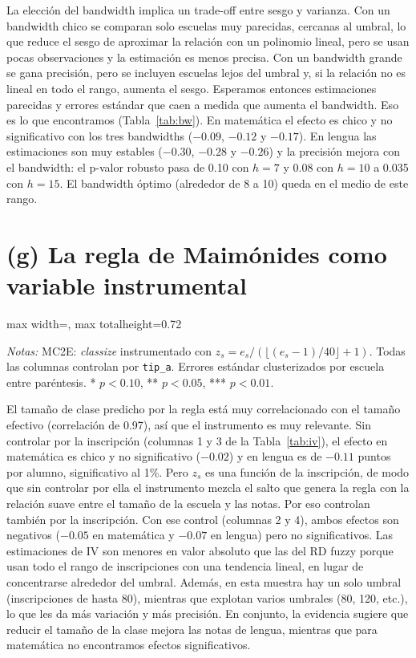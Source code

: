 \documentclass[11pt,a4paper]{article}
\newcommand{\tabla}[1]{\begin{adjustbox}{max width=\linewidth, max totalheight=0.72\textheight}\end{adjustbox}}
\newcommand{\notas}[1]{\par\vspace{0.3em}\begin{minipage}{0.92\linewidth}\footnotesize\textit{Notas:} #1\end{minipage}}
\begin{document}
La elección del bandwidth implica un trade-off entre sesgo y varianza. Con un bandwidth chico se comparan solo escuelas muy parecidas, cercanas al umbral, lo que reduce el sesgo de aproximar la relación con un polinomio lineal, pero se usan pocas observaciones y la estimación es menos precisa. Con un bandwidth grande se gana precisión, pero se incluyen escuelas lejos del umbral y, si la relación no es lineal en todo el rango, aumenta el sesgo. Esperamos entonces estimaciones parecidas y errores estándar que caen a medida que aumenta el bandwidth. Eso es lo que encontramos (Tabla~\ref{tab:bw}). En matemática el efecto es chico y no significativo con los tres bandwidths ($-0.09$, $-0.12$ y $-0.17$). En lengua las estimaciones son muy estables ($-0.30$, $-0.28$ y $-0.26$) y la precisión mejora con el bandwidth: el p-valor robusto pasa de 0.10 con $h=7$ y 0.08 con $h=10$ a 0.035 con $h=15$. El bandwidth óptimo (alrededor de 8 a 10) queda en el medio de este rango.

\section*{(g) La regla de Maimónides como variable instrumental}

\begin{table}[H]\centering
\caption{Tamaño de la clase y notas: IV con la regla de Maimónides}\label{tab:iv}
\tabla{"../output/Tabla 4.tex"}
\notas{MC2E: \textit{classize} instrumentado con $z_s=e_s/(\lfloor(e_s-1)/40\rfloor+1)$. Todas las columnas controlan por \texttt{tip\_a}. Errores estándar clusterizados por escuela entre paréntesis. * $p<0.10$, ** $p<0.05$, *** $p<0.01$.}
\end{table}

El tamaño de clase predicho por la regla está muy correlacionado con el tamaño efectivo (correlación de 0.97), así que el instrumento es muy relevante. Sin controlar por la inscripción (columnas 1 y 3 de la Tabla~\ref{tab:iv}), el efecto en matemática es chico y no significativo ($-0.02$) y en lengua es de $-0.11$ puntos por alumno, significativo al 1\%. Pero $z_s$ es una función de la inscripción, de modo que sin controlar por ella el instrumento mezcla el salto que genera la regla con la relación suave entre el tamaño de la escuela y las notas. Por eso \citet{angrist} controlan también por la inscripción. Con ese control (columnas 2 y 4), ambos efectos son negativos ($-0.05$ en matemática y $-0.07$ en lengua) pero no significativos. Las estimaciones de IV son menores en valor absoluto que las del RD fuzzy porque usan todo el rango de inscripciones con una tendencia lineal, en lugar de concentrarse alrededor del umbral. Además, en esta muestra hay un solo umbral (inscripciones de hasta 80), mientras que \citet{angrist} explotan varios umbrales (80, 120, etc.), lo que les da más variación y más precisión. En conjunto, la evidencia sugiere que reducir el tamaño de la clase mejora las notas de lengua, mientras que para matemática no encontramos efectos significativos.
\end{document}
